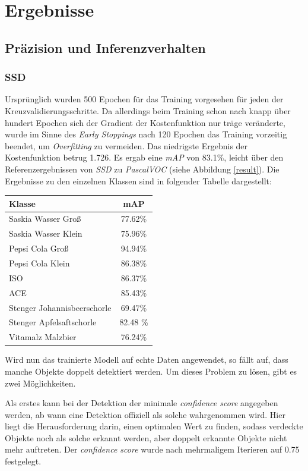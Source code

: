 \chapter{Ergebnisse}

\section{Präzision und Inferenzverhalten}

\subsection*{SSD}

Ursprünglich wurden 500 Epochen für das Training vorgesehen für jeden der Kreuzvalidierungsschritte. Da allerdings beim Training schon nach knapp über hundert Epochen sich der Gradient der Kostenfunktion nur träge veränderte, wurde im Sinne des \textit{Early Stoppings} nach 120 Epochen das Training vorzeitig beendet, um \textit{Overfitting} zu vermeiden. Das niedrigste Ergebnis der Kostenfunktion betrug 1.726. Es ergab eine \textit{mAP} von 83.1\%, leicht über den Referenzergebnissen von \textit{SSD} zu \textit{PascalVOC} (siehe Abbildung \ref{result}). Die Ergebnisse zu den einzelnen Klassen sind in folgender Tabelle dargestellt:

\begin{center}
	\begin{tabular}[h]{l|c}
		Klasse & mAP \\
		\hline
		Saskia Wasser Groß & 77.62\% \\
		Saskia Wasser Klein & 75.96\% \\
		Pepsi Cola Groß & 94.94\% \\
		Pepsi Cola Klein & 86.38\% \\
		ISO & 86.37\% \\
		ACE & 85.43\% \\
		Stenger Johannisbeerschorle & 69.47\% \\
		Stenger Apfelsaftschorle & 82.48 \% \\
		Vitamalz Malzbier & 76.24\%
	\end{tabular}
	\label{table:ssdresults}
\end{center}

Wird nun das trainierte Modell auf echte Daten angewendet, so fällt auf, dass manche Objekte doppelt detektiert werden. Um dieses Problem zu lösen, gibt es zwei Möglichkeiten. 

Als erstes kann bei der Detektion der minimale \textit{confidence score} angegeben werden, ab wann eine Detektion offiziell als solche wahrgenommen wird. Hier liegt die Herausforderung darin, einen optimalen Wert zu finden, sodass verdeckte Objekte noch als solche erkannt werden, aber doppelt erkannte Objekte nicht mehr auftreten. Der \textit{confidence score} wurde nach mehrmaligem Iterieren auf 0.75 festgelegt.

